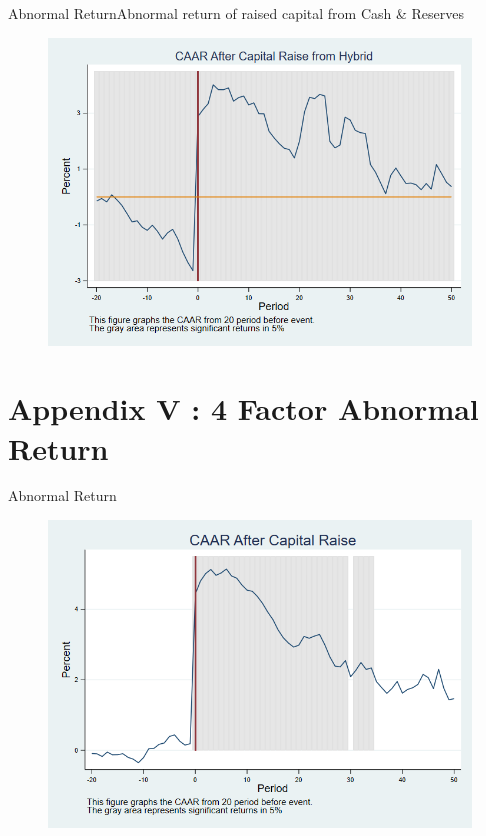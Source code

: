 \documentclass{beamer}
\begin{document}
	\begin{frame}{Abnormal Return}{Abnormal return of raised capital from Cash \& Reserves}
		\label{car_marketmodel_industryHybrid}
		\begin{figure}
			\centering
			\includegraphics[width=0.65\linewidth]{Output/car_marketmodel_industryHybrid.png}
			\label{fig:car_marketmodel_industryHybrid}
		\end{figure}
	\end{frame}
	
	
	
	
	\section{Appendix V : 4 Factor Abnormal Return}
	\begin{frame}{Abnormal Return}
		\label{car_4factor}
		\begin{figure}
			\centering
			\includegraphics[width=0.7\linewidth]{Output/car_4factor.png}
			\label{fig:car_4factor}
		\end{figure}
	\end{frame}
	
\end{document}
